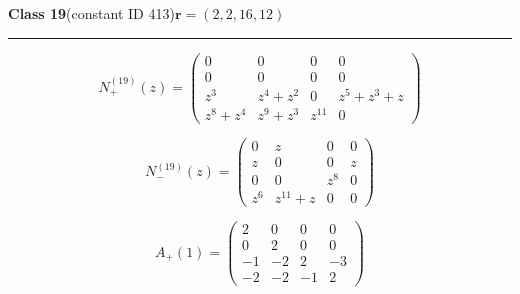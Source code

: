 \noindent\begin{minipage}{\linewidth}
\noindent\textbf{Class 19}\quad\small (constant ID 413)\hfill $\symbf{r}=(2,2,16,12)$
\par\smallskip\noindent\textcolor{rulegray}{\rule{\linewidth}{0.3pt}}
\begin{minipage}[c]{0.495\linewidth}\centering\fontsize{9.7}{12}\selectfont
\setlength{\abovedisplayskip}{4pt}\setlength{\belowdisplayskip}{4pt}
\setlength{\abovedisplayshortskip}{4pt}\setlength{\belowdisplayshortskip}{4pt}
\setlength{\arraycolsep}{3pt}\renewcommand{\arraystretch}{1.08}
\[N_{+}^{(19)}(z)=\begin{pmatrix}0 & 0 & 0 & 0\\0 & 0 & 0 & 0\\z^{3} & z^{4} + z^{2} & 0 & z^{5} + z^{3} + z\\z^{8} + z^{4} & z^{9} + z^{3} & z^{11} & 0\end{pmatrix}\]
\end{minipage}%
\begin{minipage}[c]{0.495\linewidth}\centering\fontsize{9.7}{12}\selectfont
\setlength{\abovedisplayskip}{4pt}\setlength{\belowdisplayskip}{4pt}
\setlength{\abovedisplayshortskip}{4pt}\setlength{\belowdisplayshortskip}{4pt}
\setlength{\arraycolsep}{3pt}\renewcommand{\arraystretch}{1.08}
\[N_{-}^{(19)}(z)=\begin{pmatrix}0 & z & 0 & 0\\z & 0 & 0 & z\\0 & 0 & z^{8} & 0\\z^{6} & z^{11} + z & 0 & 0\end{pmatrix}\]
\end{minipage}%
\par\noindent
\begin{minipage}[c]{0.495\linewidth}\centering\fontsize{9.7}{12}\selectfont
\setlength{\abovedisplayskip}{4pt}\setlength{\belowdisplayskip}{4pt}
\setlength{\abovedisplayshortskip}{4pt}\setlength{\belowdisplayshortskip}{4pt}
\setlength{\arraycolsep}{3pt}\renewcommand{\arraystretch}{1.08}
\[A_{+}(1)=\begin{pmatrix}2 & 0 & 0 & 0\\0 & 2 & 0 & 0\\-1 & -2 & 2 & -3\\-2 & -2 & -1 & 2\end{pmatrix}\]
\end{minipage}%
\begin{minipage}[c]{0.495\linewidth}\centering\fontsize{9.7}{12}\selectfont
\setlength{\abovedisplayskip}{4pt}\setlength{\belowdisplayskip}{4pt}

\end{minipage}
\end{minipage}
